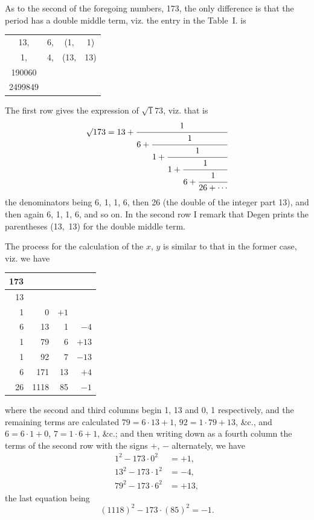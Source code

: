 \documentclass[11pt,a4paper]{book}
\begin{document}
\newpage
As to the second of the foregoing numbers, 173, the only difference is that the period has a double middle term, viz. the entry in the Table~I. is
\begin{center}
\begin{tabular}{cccc}
13, & 6, & (\phantom{1}1, & \phantom{1}1) \\
1, & 4, & (13, & 13) \\
190060 & & & \\
2499849 & & &
\end{tabular}
\end{center}
The first row gives the expression of $\surd 173$, viz. that is
\[
\surd 173 = 13 +
\cfrac{1}{6+
 \cfrac{1}{1+
  \cfrac{1}{1+
   \cfrac{1}{6+
    \cfrac{1}{26+\cdots}}}}
}
\]
the denominators being 6, 1, 1, 6, then 26 (the double of the integer part 13), and then again 6, 1, 1, 6, and so on. In the second row I remark that Degen prints the parentheses (13,~13) for the double middle term.

The process for the calculation of the $x$, $y$ is similar to that in the former case, viz. we have

\begin{center}
\begin{tabular}{r|r|r|r}
173 & & & \\ \hline
13 & & & \\
1 & 0 & $+1$ & \\
6 & 13 & 1 & $-4$ \\
1 & 79 & 6 & $+13$ \\
1 & 92 & 7 & $-13$ \\
6 & 171 & 13 & $+4$ \\
26 & 1118 & 85 & $-1$
\end{tabular}
\end{center}

where the second and third columns begin 1, 13 and 0, 1 respectively, and the remaining terms are calculated $79 = 6 \cdot 13 + 1$, $92 = 1 \cdot 79 + 13$, \&c., and $6 = 6 \cdot 1 + 0$, $7 = 1 \cdot 6 + 1$, \&c.; and then writing down as a fourth column the terms of the second row with the signs $+$, $-$ alternately, we have
\[
\begin{aligned}
1^{2} - 173 \cdot 0^{2} &= +1, \\
13^{2} - 173 \cdot 1^{2} &= -4, \\
79^{2} - 173 \cdot 6^{2} &= +13,
\end{aligned}
\]
the last equation being
\[ (1118)^{2} - 173 \cdot (85)^{2} = -1. \]
\end{document}
